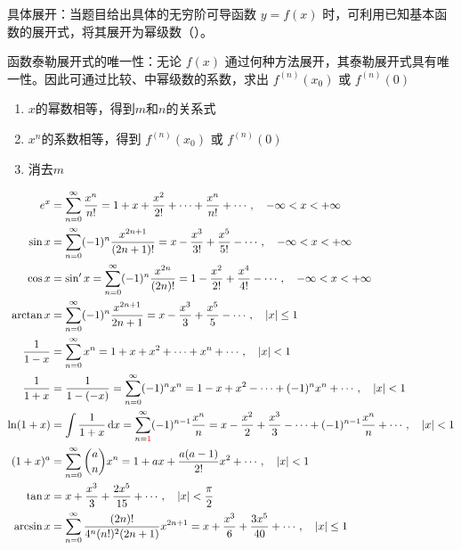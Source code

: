\documentclass[../book.tex]{subfiles}
\begin{document}
\begin{enumerate}
\begin{circlenum}
            \item 具体展开：当题目给出具体的无穷阶可导函数 $y=f(x)$ 时，可利用已知基本函数的展开式，将其展开为幂级数（{\color{red}{此处使用$m$}}）。

            \item 函数泰勒展开式的唯一性：无论 $f(x)$ 通过何种方法展开，其泰勒展开式具有唯一性。因此可通过比较、中幂级数的系数，求出 $f^{(n)}(x_0)$ 或 $f^{(n)}(0)$
            \begin{enumerate}
                \item $x$的幂数相等，得到$m$和$n$的关系式
                \item $x^n$的系数相等，得到 $f^{(n)}(x_0)$ 或 $f^{(n)}(0)$
                \item 消去$m$
            \end{enumerate}
        \end{circlenum}
        \[
            \begin{aligned}
                e^x &= \sum_{n=0}^{\infty} \frac{x^n}{n!} = 1 + x + \frac{x^2}{2!} + \cdots + \frac{x^n}{n!} + \cdots, \quad -\infty < x < +\infty \\
                \sin x &= \sum_{n=0}^{\infty} (-1)^n \frac{x^{2n+1}}{(2n+1)!} = x - \frac{x^3}{3!} + \frac{x^5}{5!} - \cdots, \quad -\infty < x < +\infty \\
                \cos x &= \sin' x = \sum_{n=0}^{\infty} (-1)^n \frac{x^{2n}}{(2n)!} = 1 - \frac{x^2}{2!} + \frac{x^4}{4!} - \cdots, \quad -\infty < x < +\infty \\
                \arctan x &= \sum_{n=0}^{\infty} (-1)^n \frac{x^{2n+1}}{2n+1} = x - \frac{x^3}{3} + \frac{x^5}{5} - \cdots, \quad |x| \le 1 \\
                \frac{1}{1-x} &= \sum_{n=0}^{\infty} x^n = 1 + x + x^2 + \cdots + x^n + \cdots, \quad |x| < 1 \\
                \frac{1}{1+x} &= \frac{1}{1 - (-x)} = \sum_{n=0}^{\infty} (-1)^n x^n = 1 - x + x^2 - \cdots + (-1)^n x^n + \cdots, \quad |x| < 1 \\
                \ln(1+x) &= \int \frac{1}{1+x}\,\mathrm{d}x = \sum_{n={\color{red}{1}}}^{\infty} (-1)^{n-1} \frac{x^n}{n} = x - \frac{x^2}{2} + \frac{x^3}{3} - \cdots + (-1)^{n-1} \frac{x^n}{n} + \cdots, \quad |x| < 1 \\
                (1+x)^a &= \sum_{n=0}^{\infty} \binom{a}{n} x^n = 1 + ax + \frac{a(a-1)}{2!} x^2 + \cdots, \quad |x| < 1 \\
                \tan x &= x + \frac{x^3}{3} + \frac{2x^5}{15} + \cdots, \quad |x| < \frac{\pi}{2} \\
                \arcsin x &= \sum_{n=0}^{\infty} \frac{(2n)!}{4^n (n!)^2 (2n+1)} x^{2n+1} = x + \frac{x^3}{6} + \frac{3x^5}{40} + \cdots, \quad |x| \le 1 \\
            \end{aligned}
        \]
    \end{enumerate}
\end{document}
